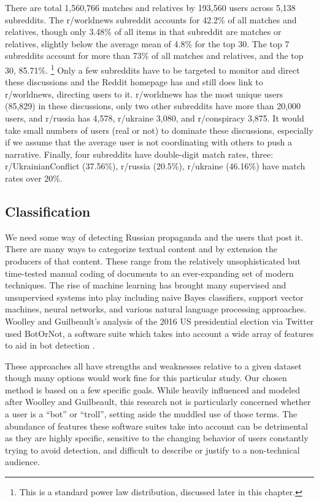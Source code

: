 There are total 1,560,766 matches and relatives by 193,560 users across 5,138 subreddits.
The r/worldnews subreddit accounts for 42.2\% of all matches and relatives, though only 3.48\% of all items in that subreddit are matches or relatives, slightly below the average mean of 4.8\% for the top 30.
The top 7 subreddits account for more than 73\% of all matches and relatives, and the top 30, 85.71\%. \footnote{This is a standard power law distribution, discussed later in this chapter.}
Only a few subreddits have to be targeted to monitor and direct these discussions and the Reddit homepage has and still does link to r/worldnews, directing users to it.
r/worldnews has the most unique users (85,829) in these discussions, only two other subreddits have more than 20,000 users, and r/russia has 4,578, r/ukraine 3,080, and r/conspiracy 3,875. 
It would take small numbers of users (real or not) to dominate these discussions, especially if we assume that the average user is not coordinating with others to push a narrative.
Finally, four subreddits have double-digit match rates, three: r/UkrainianConflict (37.56\%), r/russia (20.5\%), r/ukraine (46.16\%) have match rates over 20\%.

\subsection{Classification}

We need some way of detecting Russian propaganda and the users that post it.
There are many ways to categorize textual content and by extension the producers of that content.
These range from the relatively unsophisticated but time-tested manual coding of documents to an ever-expanding set of modern techniques.
The rise of machine learning has brought many supervised and unsupervised systems into play including naive Bayes classifiers, support vector machines, neural networks, and various natural language processing approaches.
Woolley and Guilbeault's analysis of the 2016 US presidential election via Twitter used BotOrNot, a software suite which takes into account a wide array of features to aid in bot detection \cite[p. 198]{woolley2018}.

These approaches all have strengths and weaknesses relative to a given dataset though many options would work fine for this particular study.
Our chosen method is based on a few specific goals.
While heavily influenced and modeled after Woolley and Guilbeault, this research not is particularly concerned whether a user is a ``bot'' or ``troll'', setting aside the muddled use of those terms.
The abundance of features these software suites take into account can be detrimental as they are highly specific, sensitive to the changing behavior of users constantly trying to avoid detection, and difficult to describe or justify to a non-technical audience.

